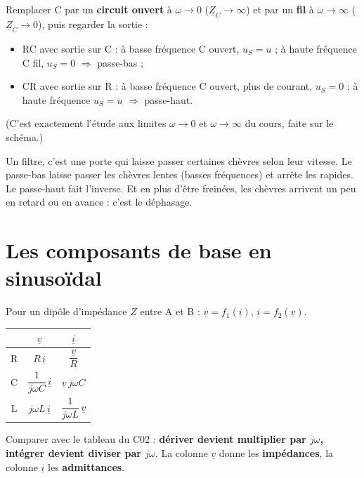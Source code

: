 \begin{exbox}[title={Méthode : reconnaître un filtre en 10 secondes}]
Remplacer C par un \textbf{circuit ouvert} à $\omega\to0$ ($\underline Z_C\to\infty$) et par
un \textbf{fil} à $\omega\to\infty$ ($\underline Z_C\to0$), puis regarder la sortie :
\begin{itemize}
  \item RC avec sortie sur C : à basse fréquence C ouvert, $u_S = u$ ; à haute fréquence C
        fil, $u_S = 0$ $\Rightarrow$ passe-bas ;
  \item CR avec sortie sur R : à basse fréquence C ouvert, plus de courant, $u_S = 0$ ; à
        haute fréquence $u_S = u$ $\Rightarrow$ passe-haut.
\end{itemize}
(C'est exactement l'étude aux limites $\omega\to0$ et $\omega\to\infty$ du cours, faite sur le
schéma.)
\end{exbox}

\begin{goatbox}
Un filtre, c'est une porte qui laisse passer certaines chèvres selon leur vitesse. Le
passe-bas laisse passer les chèvres lentes (basses fréquences) et arrête les rapides. Le
passe-haut fait l'inverse. Et en plus d'être freinées, les chèvres arrivent un peu en retard
ou en avance : c'est le déphasage.
\end{goatbox}

\section{Les composants de base en sinusoïdal}


\begin{thmbox}[title=Tableau en grandeurs complexes]
Pour un dipôle d'impédance $\underline Z$ entre A et B : $\underline v = f_1(\underline i)$,
$\underline i = f_2(\underline v)$.
\begin{center}
\renewcommand{\arraystretch}{1.6}
\begin{tabular}{c|c|c}
 & $\underline v$ & $\underline i$ \\ \hline
R & $R\,\underline i$ & $\dfrac{\underline v}{R}$ \\
C & $\dfrac1{j\omega C}\,\underline i$ & $\underline v\,j\omega C$ \\
L & $j\omega L\,\underline i$ & $\dfrac1{j\omega L}\,\underline v$ \\
\end{tabular}
\end{center}
Comparer avec le tableau du C02 : \textbf{dériver devient multiplier par $j\omega$,
intégrer devient diviser par $j\omega$}. La colonne $\underline v$ donne les
\textbf{impédances}, la colonne $\underline i$ les \textbf{admittances}.
\end{thmbox}

